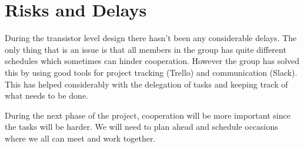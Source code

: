 \section{Risks and Delays} \label{sec:risks}
During the transistor level design there hasn't been any considerable delays. The only thing that is an issue is that all members in the group has quite different schedules which sometimes can hinder cooperation. However the group has solved this by using good tools for project tracking (Trello) and communication (Slack). This has helped considerably with the delegation of tasks and keeping track of what needs to be done. 

During the next phase of the project, cooperation will be more important since the tasks will be harder. We will need to plan ahead and schedule occasions where we all can meet and work together.
